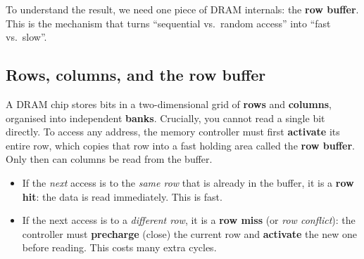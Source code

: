 \documentclass[11pt,a4paper]{article}
\newcommand{\term}[1]{\textbf{\color{slate}#1}}
\begin{document}
To understand the result, we need one piece of DRAM internals: the \term{row buffer}. This is the
mechanism that turns ``sequential vs.\ random access'' into ``fast vs.\ slow''.

\subsection{Rows, columns, and the row buffer}

A DRAM chip stores bits in a two-dimensional grid of \term{rows} and \term{columns}, organised into
independent \term{banks}. Crucially, you cannot read a single bit directly. To access any address,
the memory controller must first \term{activate} its entire row, which copies that row into a fast
holding area called the \term{row buffer}. Only then can columns be read from the buffer.

\begin{itemize}
\item If the \emph{next} access is to the \emph{same row} that is already in the buffer, it is a
\term{row hit}: the data is read immediately. This is fast.
\item If the next access is to a \emph{different row}, it is a \term{row miss} (or \emph{row
conflict}): the controller must \term{precharge} (close) the current row and \term{activate} the new
one before reading. This costs many extra cycles.
\end{itemize}

\begin{center}
\end{center}
\end{document}
